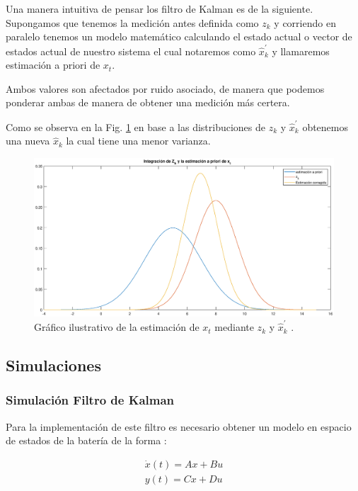 \documentclass[10pt,a4paper]{article}
\begin{document}
	Una manera intuitiva de pensar los filtro de Kalman es de la siguiente.
	Supongamos que tenemos la medición antes definida como $z_k$ y corriendo en paralelo tenemos un modelo matemático calculando el estado actual o vector de estados actual de nuestro sistema el cual notaremos como $\hat{x}^\prime_k$ y llamaremos estimación a priori de $x_{t}$.
	
	Ambos valores son afectados por ruido asociado, de manera que podemos ponderar ambas de manera de obtener una medición más certera.
	
	Como se observa en la Fig. \ref{KF_Integration_concept} en base a las distribuciones de $z_k$ y $\hat{x}^\prime_k$ obtenemos una nueva $\hat{x}_k$ la cual tiene una menor varianza.
	
	\begin{figure}[h!]
		\begin{center}
			\includegraphics[width=1\textwidth]{KF_Integration_concept.eps}
			\caption{Gráfico ilustrativo de la estimación de $x_{t}$ mediante $z_k$ y $\hat{x}^\prime_k$ .}
			\label{KF_Integration_concept}
		\end{center}
	\end{figure}
    \FloatBarrier
	
	\subsection{Simulaciones}

	\subsubsection{Simulación Filtro de Kalman}

	Para la implementación de este filtro es necesario obtener un modelo en espacio de estados de la batería de la forma :
	
	\begin{align}
		\dot{x}(t) = Ax+Bu	\nonumber\\
		y(t)=Cx+Du
		\label{SS_Model_generic}	
	\end{align}
	
\end{document}
